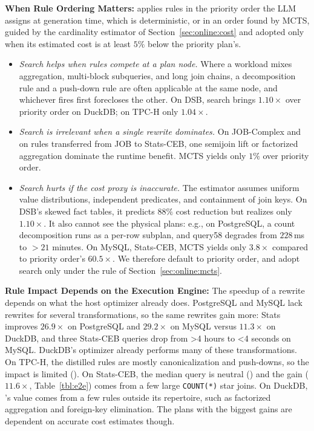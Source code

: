 \textbf{When Rule Ordering Matters:} {\sys} applies rules in the priority order the LLM assigns at generation time, which is deterministic, or in an order found by MCTS, guided by the cardinality estimator of Section~\ref{sec:online:cost} and adopted only when its estimated cost is at least $5\%$ below the priority plan's.
\begin{itemize}
\item \emph{Search helps when rules compete at a plan node.} Where a workload mixes aggregation, multi-block subqueries, and long join chains, a decomposition rule and a push-down rule are often applicable at the same node, and whichever fires first forecloses the other. On \textsf{DSB}, search brings $1.10\times$ over priority order on DuckDB; on \textsf{TPC-H} only $1.04\times$.
\item \emph{Search is irrelevant when a single rewrite dominates.} On \textsf{JOB-Complex} and on rules transferred from \textsf{JOB} to \textsf{Stats-CEB}, one semijoin lift or factorized aggregation dominate the runtime benefit. MCTS yields only $1\%$ over priority order.
\item \emph{Search hurts if the cost proxy is inaccurate.} The estimator assumes uniform value distributions, independent predicates, and containment of join keys. On \textsf{DSB}'s skewed fact tables, it predicts $88\%$ cost reduction but realizes only $1.10\times$. It also cannot see the physical plans: e.g., on PostgreSQL, a count decomposition runs as a per-row subplan, and \textsf{query58} degrades from $228$\,ms to $>21$ minutes. On MySQL, \textsf{Stats-CEB}, MCTS yields only $3.8\times$ compared to priority order's $60.5\times$. We therefore default to priority order, and adopt search only under the rule of Section~\ref{sec:online:mcts}.
\end{itemize}

\textbf{Rule Impact Depends on the Execution Engine:} The speedup of a rewrite depends on what the host optimizer already does. PostgreSQL and MySQL lack rewrites for several {\sys} transformations, so the same rewrites gain more: \textsf{Stats} improves $26.9\times$ on PostgreSQL and $29.2\times$ on MySQL versus $11.3\times$ on DuckDB, and three \textsf{Stats-CEB} queries drop from >4 hours to <4 seconds on MySQL. DuckDB's optimizer already performs many of these transformations. On \textsf{TPC-H}, the distilled rules are mostly canonicalization and push-downs, so the impact is limited (\blue{$1.11\times$}). On \textsf{Stats-CEB}, the median query is neutral (\blue{$0.86\times$}) and the gain ($11.6\times$, Table~\ref{tbl:e2e}) comes from a few large \texttt{COUNT(*)} star joins. On DuckDB, {\sys}'s value comes from a few rules outside its repertoire, such as factorized aggregation and foreign-key elimination. The plans with the biggest gains are dependent on accurate cost estimates though.